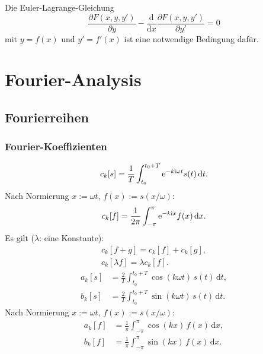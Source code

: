 Die Euler-Lagrange-Gleichung
\begin{equation}
\frac{\partial F(x,y,y')}{\partial y}
-\frac{\mathrm d}{\mathrm dx}\frac{\partial F(x,y,y')}{\partial y'}
=0
\end{equation}
mit $y=f(x)$ und $y'=f'(x)$ ist eine notwendige Bedingung dafür.

\newpage
\section{Fourier-Analysis}
\subsection{Fourierreihen}
\subsubsection{Fourier-Koeffizienten}
\begin{equation}
c_k[s] = \frac{1}{T}\int_{t_0}^{t_0+T} \mathrm e^{-k\mathrm i\omega t}s(t)\,\mathrm dt.
\end{equation}
Nach Normierung $x:=\omega t$, $f(x):=s(x/\omega)$:
\begin{equation}
c_k[f] = \frac{1}{2\pi}\int_{-\pi}^{\pi} \mathrm e^{-k\mathrm i x}f(x)\,\mathrm dx.
\end{equation}
Es gilt ($\lambda$: eine Konstante):
\begin{gather}
c_k[f+g] = c_k[f]+c_k[g],\\
c_k[\lambda f] = \lambda c_k[f].
\end{gather}
\begin{align}
a_k[s] &= \frac{2}{T}\int_{t_0}^{t_0+T} \cos(k\omega t)\,s(t)\,\mathrm dt,\\
b_k[s] &= \frac{2}{T}\int_{t_0}^{t_0+T} \sin(k\omega t)\,s(t)\,\mathrm dt.
\end{align}
Nach Normierung $x:=\omega t$, $f(x):=s(x/\omega)$:
\begin{align}
a_k[f] &= \frac{1}{\pi}\int_{-\pi}^{\pi} \cos(kx)\,f(x)\,\mathrm dx,\\
b_k[f] &= \frac{1}{\pi}\int_{-\pi}^{\pi} \sin(kx)\,f(x)\,\mathrm dx.
\end{align}

